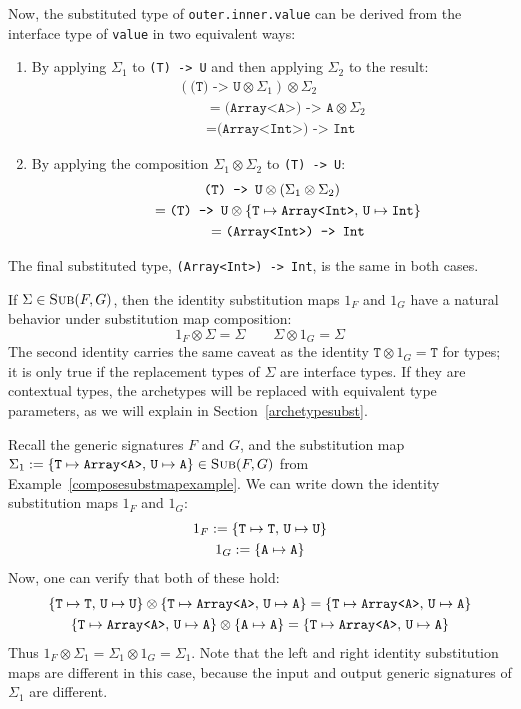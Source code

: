 \documentclass[../generics]{subfiles}
\begin{document}
\begin{example}
Now, the substituted type of \texttt{outer.inner.value} can be derived from the interface type of \texttt{value} in two equivalent ways:
\begin{enumerate}
\item By applying $\Sigma_1$ to \verb|(T) -> U| and then applying $\Sigma_2$ to the result:
\begin{gather*}
(\texttt{(T) -> U}\otimes\Sigma_1)\otimes \Sigma_2\\
\qquad {} = \texttt{(Array<A>) -> A}\otimes \Sigma_2\\
\qquad {} = \texttt{(Array<Int>) -> Int}
\end{gather*}
\item By applying the composition $\Sigma_1\otimes\Sigma_2$ to \texttt{(T) -> U}:
\begin{gather*}
\texttt{(T) -> U}\otimes(\Sigma_1\otimes \Sigma_2)\\
\qquad {} = \texttt{(T) -> U}\otimes \{ \texttt{T} \mapsto \texttt{Array<Int>},\,\texttt{U} \mapsto \texttt{Int} \}\\
\qquad {} = \texttt{(Array<Int>) -> Int}
\end{gather*}
\end{enumerate}
The final substituted type, \texttt{(Array<Int>) -> Int}, is the same in both cases.
\end{example}
If $\Sigma\in\textsc{Sub}({F, G})$, then the identity substitution maps $1_F$ and $1_G$ have a natural behavior under substitution map composition:
\[1_F\otimes\Sigma = \Sigma\qquad\Sigma\otimes 1_G = \Sigma\]
The second identity carries the same caveat as the identity $\texttt{T}\otimes 1_G=\texttt{T}$ for types; it is only true if the replacement types of $\Sigma$ are interface types. If they are contextual types, the archetypes will be replaced with equivalent type parameters, as we will explain in Section~\ref{archetypesubst}.
\begin{example}
Recall the generic signatures $F$ and $G$, and the substitution map $\Sigma_1 := \{ \texttt{T} \mapsto \texttt{Array<A>},\,\texttt{U} \mapsto \texttt{A} \}\in\textsc{Sub}({F, G})$ from Example~\ref{composesubstmapexample}. We can write down the identity substitution maps $1_F$ and $1_G$:
\begin{gather*}
1_F := \{\texttt{T} \mapsto \texttt{T},\,\texttt{U} \mapsto \texttt{U}\}\\
1_G := \{\texttt{A} \mapsto \texttt{A}\}
\end{gather*}
Now, one can verify that both of these hold:
\begin{gather*}
\{\texttt{T} \mapsto \texttt{T},\,\texttt{U} \mapsto \texttt{U}\}\otimes\{ \texttt{T} \mapsto \texttt{Array<A>},\,\texttt{U} \mapsto \texttt{A} \}=\{ \texttt{T} \mapsto \texttt{Array<A>},\,\texttt{U} \mapsto \texttt{A} \}\\
\{ \texttt{T} \mapsto \texttt{Array<A>},\,\texttt{U} \mapsto \texttt{A} \}\otimes\{\texttt{A} \mapsto \texttt{A}\}=\{ \texttt{T} \mapsto \texttt{Array<A>},\,\texttt{U} \mapsto \texttt{A} \}
\end{gather*}
Thus $1_F\otimes\Sigma_1 = \Sigma_1\otimes 1_G=\Sigma_1$. Note that the left and right identity substitution maps are different in this case, because the input and output generic signatures of $\Sigma_1$ are different.
\end{example}
\end{document}

